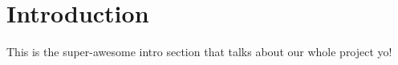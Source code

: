 \section{Introduction}
This is the super-awesome intro section that talks about our
whole project yo!
